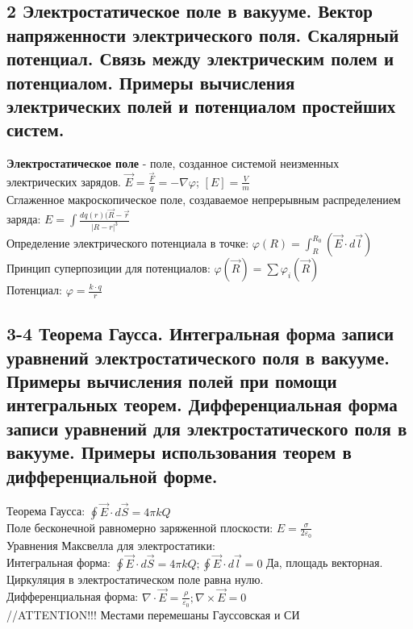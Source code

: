 \documentclass[a4paper,12pt]{article}
\begin{document}
\subsection{2   Электростатическое поле в вакууме. Вектор напряженности электрического поля. Скалярный потенциал. Связь между электрическим полем и потенциалом. Примеры вычисления электрических полей и потенциалом простейших систем.}
\textbf{Электростатическое поле} - поле, созданное системой неизменных электрических зарядов. $\vec{E} = \frac{\vec{F}}{q} = -\nabla \varphi$; $[E] = \frac{V}{m}$\\
Сглаженное макроскопическое поле, создаваемое непрерывным распределением заряда: $E = \int \frac{dq(r) (\vec{R} - \vec{r}}{|R - r|^3}$\\
Определение электрического потенциала в точке: $\varphi (R) = \int _R ^{R_0} (\vec{E} \cdot d\vec{l})$\\
Принцип суперпозиции для потенциалов: $\varphi (\vec{R}) = \sum \varphi _i (\vec{R})$\\
Потенциал: $ \varphi = \frac{k \cdot q}{r} $\\



\subsection{3-4  Теорема Гаусса. Интегральная форма записи уравнений электростатического поля в вакууме. Примеры вычисления полей при помощи интегральных теорем. Дифференциальная форма записи уравнений для электростатического поля в вакууме. Примеры использования теорем в дифференциальной форме.}
Теорема Гаусса: $\oint \vec{E} \cdot d\vec{S} = 4 \pi k Q $\\
Поле бесконечной равномерно заряженной плоскости: $E = \frac{\sigma}{2 \varepsilon _0}$\\
Уравнения Максвелла для электростатики:\\
Интегральная форма: $\oint \vec{E} \cdot d\vec{S} = 4 \pi k Q; \oint \vec{E} \cdot d\vec{l} = 0$ Да, площадь векторная.\\ Циркуляция в электростатическом поле равна нулю.\\
Дифференциальная форма: $ \nabla \cdot \vec{E} = \frac{\rho}{\varepsilon _0};\nabla \times \vec{E} = 0$\\
//ATTENTION!!! Местами перемешаны Гауссовская и СИ
\end{document}
